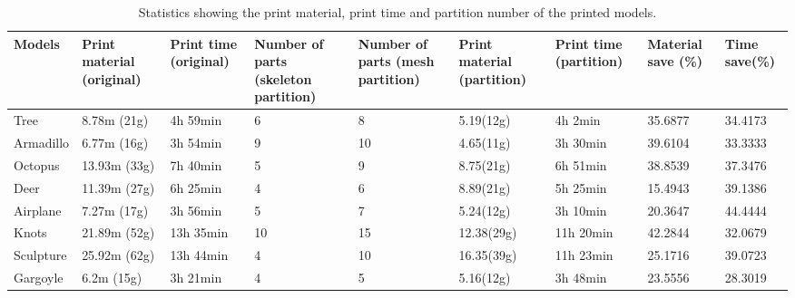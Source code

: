 \begin{table}[htb]

\begin{footnotesize}

\begin{center}

    \begin{tabular}{p{1cm} p{2cm} p{2cm} p{1.6cm} p{1.6cm} p{1.5cm} p{1.5cm} p{1.5cm} p{1.5cm}}

    \hline

     Models& Print material (original)& Print time (original)& Number of parts (skeleton partition)& Number of parts (mesh partition)& Print material (partition)& Print time (partition)& Material save (\%) &Time save(\%)\\ \hline
     Tree& 8.78m (21g)& 4h 59min &6 & 8 &5.19(12g) & 4h 2min & 35.6877 &34.4173\\ \hline
     Armadillo& 6.77m (16g)& 3h 54min &9 & 10  &4.65(11g) & 3h 30min & 39.6104 &33.3333\\ \hline
     Octopus& 13.93m (33g)& 7h 40min &5 & 9  &8.75(21g) &6h 51min & 38.8539 &37.3476\\ \hline
     Deer& 11.39m (27g)& 6h 25min &4 & 6  &8.89(21g) &5h 25min & 15.4943 &39.1386\\ \hline
     Airplane& 7.27m (17g)& 3h 56min &5 & 7 &5.24(12g) &3h 10min & 20.3647 &44.4444\\ \hline
     Knots& 21.89m (52g)& 13h 35min &10 & 15 &12.38(29g) &11h 20min & 42.2844 &32.0679\\ \hline
     Sculpture& 25.92m (62g)& 13h 44min &4 & 10 &16.35(39g) &11h 23min & 25.1716 &39.0723\\ \hline
     Gargoyle& 6.2m (15g)& 3h 21min &4 & 5 &5.16(12g) &3h 48min & 23.5556 &28.3019\\ \hline

  \hline

    \end{tabular}

\end{center}

\end{footnotesize}

\caption{Statistics showing the print material, print time and partition number of the printed models.}\label{tab:ertms:summary}

\end{table}


